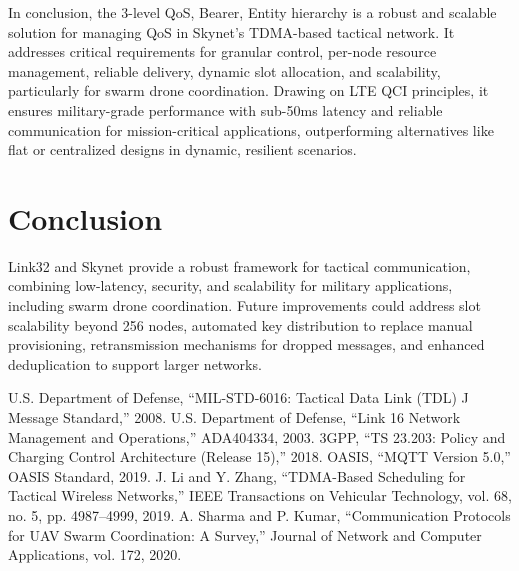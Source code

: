 \documentclass{article}
\begin{document}
In conclusion, the 3-level QoS, Bearer, Entity hierarchy is a robust and scalable solution for
managing QoS in Skynet’s TDMA-based tactical network. It addresses critical requirements for
granular control, per-node resource management, reliable delivery, dynamic slot allocation, and
scalability, particularly for swarm drone coordination. Drawing on LTE QCI principles, it ensures
military-grade performance with sub-50ms latency and reliable communication for mission-critical
applications, outperforming alternatives like flat or centralized designs in dynamic, resilient
scenarios.

\section{Conclusion}
Link32 and Skynet provide a robust framework for tactical communication, combining low-latency,
security, and scalability for military applications, including swarm drone coordination. Future
improvements could address slot scalability beyond 256 nodes, automated key distribution to replace
manual provisioning, retransmission mechanisms for dropped messages, and enhanced deduplication to
support larger networks.

\begin{thebibliography}{10}
 U.S. Department of Defense, ``MIL-STD-6016: Tactical Data Link (TDL) J
                      Message Standard,'' 2008.
 U.S. Department of Defense, ``Link 16 Network Management and Operations,''
                     ADA404334, 2003.
 3GPP, ``TS 23.203: Policy and Charging Control Architecture (Release 15),''
                    2018.
 OASIS, ``MQTT Version 5.0,'' OASIS Standard, 2019.
 J. Li and Y. Zhang, ``TDMA-Based Scheduling for Tactical Wireless
                        Networks,'' IEEE Transactions on Vehicular Technology, vol. 68, no. 5,
                        pp. 4987--4999, 2019.
 A. Sharma and P. Kumar, ``Communication Protocols for UAV Swarm
                       Coordination: A Survey,'' Journal of Network and Computer Applications,
                       vol. 172, 2020.
\end{thebibliography}
\end{document}
